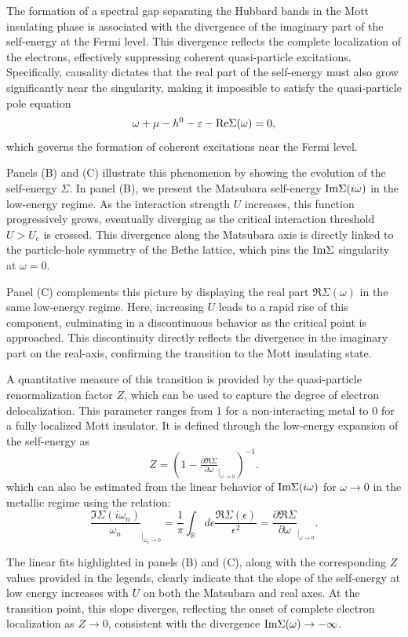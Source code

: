 \documentclass[edipack2.tex]{subfiles}
\begin{document}
The formation of a spectral gap separating the Hubbard bands in the 
Mott insulating phase is associated with the divergence of the 
imaginary part of the self-energy at the Fermi level. This divergence 
reflects the complete localization of the electrons, effectively 
suppressing coherent quasi-particle excitations. Specifically, 
causality dictates that the real part of the self-energy must also 
grow significantly near the singularity, making it impossible to 
satisfy the quasi-particle pole equation
$$
\omega+\mu-h^0-\varepsilon-{\rm Re}{\Sigma}(\omega)=0,
$$
which governs the formation of coherent excitations near the Fermi 
level.

Panels (B) and (C) illustrate this phenomenon by showing the evolution 
of the self-energy $\Sigma$. In panel (B), we present the Matsubara 
self-energy ${\rm Im}\Sigma(i\omega)$ in the low-energy regime. As the 
interaction strength $U$ increases, this function progressively 
grows, eventually diverging as the critical interaction threshold 
$U > U_\mathrm{c}$ is crossed.
This divergence along the Matsubara axis is directly linked to the
particle-hole symmetry of the Bethe lattice, which pins the  ${\rm
  Im}\Sigma$ singularity at $\omega = 0$.

Panel (C) complements this picture by displaying the real part 
$\Re{\Sigma}(\omega)$ in the same low-energy regime. Here, increasing 
$U$ leads to a rapid rise of this component, culminating in a 
discontinuous behavior as the critical point is approached. This 
discontinuity directly reflects the divergence in the imaginary part
on the real-axis,  confirming the transition to the Mott insulating state.


A quantitative measure of this transition is provided by the 
quasi-particle renormalization factor $Z$, which can be used to capture the degree 
of electron delocalization. This parameter ranges from 1 for a 
non-interacting metal to 0 for a fully localized Mott insulator. It is 
defined through the low-energy expansion of the self-energy as
$$
Z=(1-\tfrac{\partial\Re\Sigma}{\partial\omega}_{|_{\omega\rightarrow
    0}})^{-1}.
$$
which can also be estimated from the linear behavior of ${\rm Im}\Sigma(i\omega)$ for 
$\omega\to0$ in the metallic regime using the relation:
$$
   \frac{\Im\Sigma(i\omega_n)}{\omega_n}_{|_{\omega_n\rightarrow 0}}=
   \frac{1}{\pi}\int_{\mathbb R}d\epsilon \frac{\Re\Sigma(\epsilon)}{\epsilon^2}=
   \frac{\partial\Re\Sigma}{\partial\omega}_{|_{\omega\rightarrow 0}}.
$$

The linear fits highlighted in panels (B) and (C), along with the 
corresponding $Z$ values provided in the legends, clearly indicate that 
the slope of the self-energy at low energy increases with $U$ on both 
the Matsubara and real axes. At the transition point, this slope 
diverges, reflecting the onset of complete electron localization as 
$Z \to 0$, consistent with the divergence 
${\rm Im}\Sigma(\omega) \rightarrow -\infty$.
\end{document}
